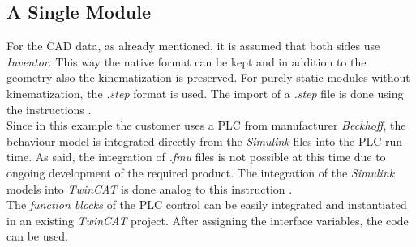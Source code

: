     \subsection{A Single Module}
    
    For the CAD data, as already mentioned, it is assumed that both sides use \textit{Inventor}. This way the native format can be kept and in addition to the geometry also the kinematization is preserved. For purely static modules without kinematization, the \textit{.step} format is used. The import of a \textit{.step} file is done using the instructions \cite{InventorAnleitungImportStep}. \\
    
    Since in this example the customer uses a PLC from manufacturer \textit{Beckhoff}, the behaviour model is integrated directly from the \textit{Simulink} files into the PLC run-time. As said, the integration of \textit{.fmu} files is not possible at this time due to ongoing development of the required product. The integration of the \textit{Simulink} models into \textit{TwinCAT} is done analog to this instruction \cite{TwincatGenerateTccom}. \\
    
    The \textit{function blocks} of the PLC control can be easily integrated and instantiated in an existing \textit{TwinCAT} project. After assigning the interface variables, the code can be used. 


